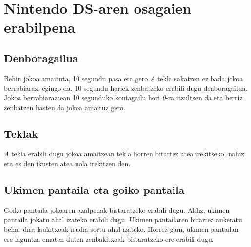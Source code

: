 \documentclass[dvipsnames]{AritzhClass}
\begin{document}
\section{Nintendo DS-aren osagaien erabilpena}
\subsection{Denboragailua}
Behin jokoa amaituta, 10 segundu pasa eta gero \textit{A} tekla sakatzen ez bada jokoa berrabiarazi egingo da. 10 segundu horiek zenbatzeko erabili dugu denboragailua. Jokoa berrabiaraztean 10 segunduko kontagailu hori \textit{0}-ra itzultzen da eta berriz zenbatzen hasten da jokoa amaituz gero.
\subsection{Teklak}
\textit{A} tekla erabili dugu jokoa amaitzean tekla horren bitartez atea irekitzeko, nahiz eta ez den ikusten atea nola irekitzen den.
\subsection{Ukimen pantaila eta goiko pantaila}
Goiko pantaila jokoaren azalpenak bistaratzeko erabili dugu. Aldiz, ukimen pantaila jokatu ahal izateko erabili dugu. Ukimen pantailaren bitartez aukeratu behar dira laukitxoak irudia sortu ahal izateko. Horrez gain, ukimen pantailan ere laguntza ematen duten zenbakitxoak bistaratzeko ere erabili dugu. 
\end{document}

